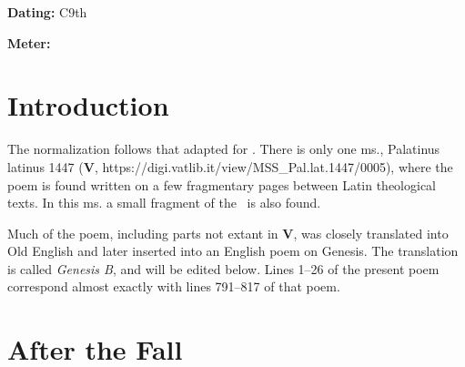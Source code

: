 
\begin{flushright}%
\textbf{Dating:} C9th

\textbf{Meter:} \Fornyrdislag%
\end{flushright}%

\section{Introduction}

The normalization follows that adapted for \Heliand.  There is only one ms., Palatinus latinus 1447 (\textbf{V}, https://digi.vatlib.it/view/MSS\_Pal.lat.1447/0005), where the poem is found written on a few fragmentary pages between Latin theological texts.  In this ms. a small fragment of the \Heliand\ is also found.

Much of the poem, including parts not extant in \textbf{V}, was closely translated into Old English and later inserted into an English poem on Genesis.  The translation is called \emph{Genesis B}, and will be edited below.  Lines 1–26 of the present poem correspond almost exactly with lines 791–817 of that poem.

\sectionline

\section{After the Fall}

